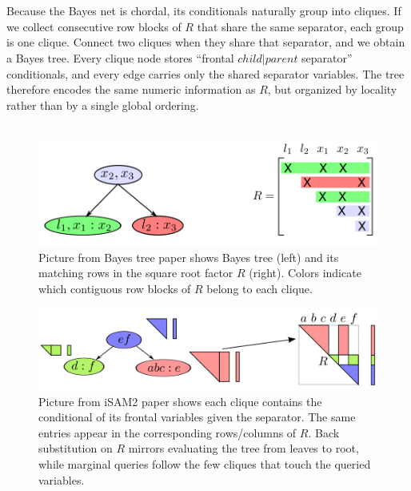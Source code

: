 \\ \\
Because the Bayes net is chordal, its conditionals naturally group into cliques. If we collect consecutive row blocks of $R$ that share the same separator, each group is one clique. Connect two cliques when they share that separator, and we obtain a Bayes tree. Every clique node stores ``frontal $child|parent$ separator'' conditionals, and every edge carries only the shared separator variables. The tree therefore encodes the same numeric information as $R$, but organized by locality rather than by a single global ordering.
\\ \\
\begin{figure}[H]
    \centering
    \includegraphics[width=0.98\linewidth]{Pictures/Optimizers/iSAM2/R_matrix_as_bayes_tree1.png}
    \caption{Picture from Bayes tree paper \cite{Bayes_tree_for_SLAM_paper} shows Bayes tree (left) and its matching rows in the square root factor $R$ (right). Colors indicate which contiguous row blocks of $R$ belong to each clique.}
    \label{fig:optimizer-iSAM2-R-to-tree-1}
\end{figure}
\begin{figure}[H]
    \centering
    \includegraphics[width=0.98\linewidth]{Pictures/Optimizers/iSAM2/R_matrix_as_bayes_tree2.png}
    \caption{Picture from \gls{iSAM}2 paper \cite{iSAM2_paper} shows each clique contains the conditional of its frontal variables given the separator. The same entries appear in the corresponding rows/columns of $R$. Back substitution on $R$ mirrors evaluating the tree from leaves to root, while marginal queries follow the few cliques that touch the queried variables.}
    \label{fig:optimizer-iSAM2-R-to-tree-2}
\end{figure}
